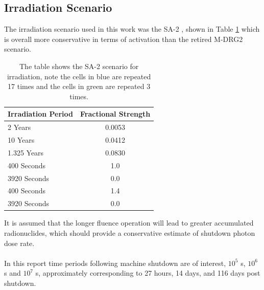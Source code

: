 \documentclass[12pt]{article}
\begin{document}
\subsection{Irradiation Scenario}
The irradiation scenario used in this work was the SA-2 \cite{sa2_irradiation}, 
shown in Table \ref{tab:irrad_scenario} which is overall more conservative in 
terms of activation than the retired M-DRG2 scenario.
\begin{table}[ht!]
   \begin{tabular}{| l | c |}
      \hline 
      Irradiation Period & Fractional Strength \\
      \hline
      2 Years & 0.0053 \\
      10 Years & 0.0412 \\
      1.325 Years & 0.0830 \\
      \cellcolor{blue!25} 400 Seconds & \cellcolor{blue!25} 1.0  \\
      \cellcolor{blue!25} 3920 Seconds & \cellcolor{blue!25} 0.0 \\
      \cellcolor{green!25} 400 Seconds & \cellcolor{green!25} 1.4 \\
      \cellcolor{green!25} 3920 Seconds & \cellcolor{green!25} 0.0 \\
      \hline
\end{tabular}
\caption{The table shows the SA-2 scenario for irradiation, note the
         cells in \textcolor{blue!25}{blue} are repeated 17 times
         and the cells in \textcolor{green!25}{green} are repeated 3
         times.}
\label{tab:irrad_scenario}
\end{table}
It is assumed that the longer fluence operation will lead to greater accumulated
radionuclides, which should provide a conservative estimate of shutdown photon
dose rate.
\\
\\
In this report time periods following machine shutdown are of interest,
$10^5$ s, $10^6$ s and $10^7$ s, approximately
corresponding to 27 hours, 14 days, and 116 days post shutdown.
\end{document}

